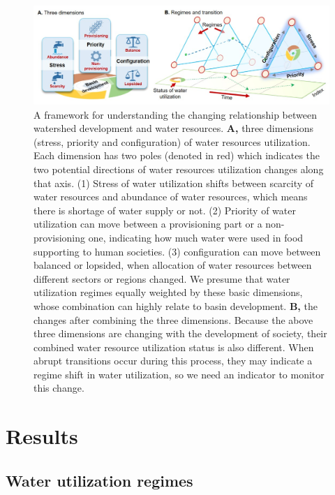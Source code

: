 \documentclass[9pt, twocolumn, twoside, lineno]{pnas-new}
\begin{document}
\begin{figure}%
	\centering
	\includegraphics[width=0.8\linewidth]{../../figures/main/framework.jpg}
	\caption{
		A framework for understanding the changing relationship between watershed development and water resources.
		\textbf{A,} three dimensions (stress, priority and configuration) of water resources utilization. Each dimension has two poles (denoted in red) which indicates the two potential directions of water resources utilization changes along that axis. (1) Stress of water utilization shifts between scarcity of water resources and abundance of water resources, which means there is shortage of water supply or not. (2) Priority of water utilization can move between a provisioning part or a non-provisioning one, indicating how much water were used in food supporting to human societies. (3) configuration can move between balanced or lopsided, when allocation of water resources between different sectors or regions changed. We presume that water utilization regimes equally weighted by these basic dimensions, whose combination can highly relate to basin development. 
		\textbf{B,} the changes after combining the three dimensions. Because the above three dimensions are changing with the development of society, their combined water resource utilization status is also different. When abrupt transitions occur during this process, they may indicate a regime shift in water utilization, so we need an indicator to monitor this change.
	}
	\label{fig:framework}
\end{figure}


\section*{Results}
\subsection*{Water utilization regimes}
\end{document}
